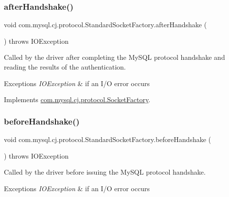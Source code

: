 \subsubsection{\texorpdfstring{after\+Handshake()}{afterHandshake()}}
{\footnotesize\ttfamily void com.\+mysql.\+cj.\+protocol.\+Standard\+Socket\+Factory.\+after\+Handshake (\begin{DoxyParamCaption}{ }\end{DoxyParamCaption}) throws I\+O\+Exception}

Called by the driver after completing the My\+S\+QL protocol handshake and reading the results of the authentication.


\begin{DoxyExceptions}{Exceptions}
{\em I\+O\+Exception} & if an I/O error occurs \\
\hline
\end{DoxyExceptions}


Implements \mbox{\hyperlink{interfacecom_1_1mysql_1_1cj_1_1protocol_1_1_socket_factory_acfbef33f9924346f5fbfc476bf0667d9}{com.\+mysql.\+cj.\+protocol.\+Socket\+Factory}}.

\mbox{\label{classcom_1_1mysql_1_1cj_1_1protocol_1_1_standard_socket_factory_a4e13a5c155c986e139058ab3933017fe}} 
\subsubsection{\texorpdfstring{before\+Handshake()}{beforeHandshake()}}
{\footnotesize\ttfamily void com.\+mysql.\+cj.\+protocol.\+Standard\+Socket\+Factory.\+before\+Handshake (\begin{DoxyParamCaption}{ }\end{DoxyParamCaption}) throws I\+O\+Exception}

Called by the driver before issuing the My\+S\+QL protocol handshake.


\begin{DoxyExceptions}{Exceptions}
{\em I\+O\+Exception} & if an I/O error occurs \\
\hline
\end{DoxyExceptions}


